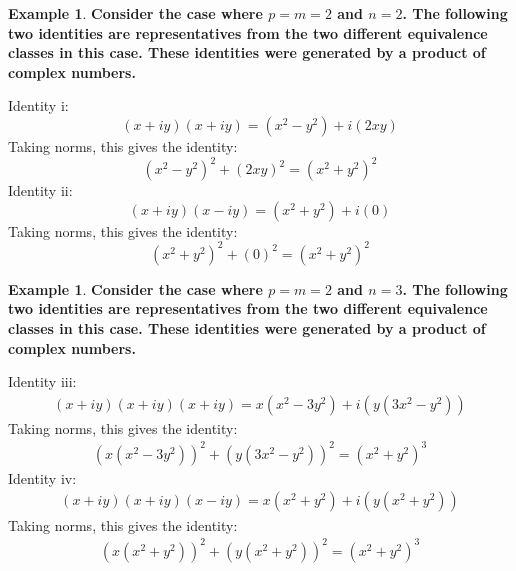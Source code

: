 \documentclass[12pt]{article}
\theoremstyle{definition}
\newtheorem{example}[theorem]{Example}
\numberwithin{equation}{section}
\begin{document}
\begin{example}
\bf
Consider the case where \( p = m = 2 \) and \( n = 2\).
The following two identities are representatives from 
the two different equivalence classes in this case. These identities
were generated by a product of complex numbers. 

\noindent
Identity i:
\begin{equation*}
(x + iy)(x + iy) = (x^2 - y^2 ) + i(2xy) 
\end{equation*}
Taking norms, this gives the identity:
\begin{equation*}
    (x^2 - y^2 )^2 + (2xy)^2 
    = (x^2 + y^2)^2
\end{equation*}
Identity ii:
\begin{equation*}
    (x + iy )(x - iy )
    = (x^2 + y^2 ) + i(0)  
\end{equation*}
Taking norms, this gives the identity:
\begin{equation*}
    (x^2 + y^2 )^2 + (0)^2
    = (x^2 + y^2 )^2
\end{equation*}
\end{example}



\begin{example}
\bf
Consider the case where \( p = m = 2 \) and \( n = 3\).
The following two identities are representatives from 
the two different equivalence classes in this case. These identities
were generated by a product of complex numbers. 

\noindent
Identity iii:
\begin{align*}
    (x + iy)(x + iy)(x + iy) 
    = x(x^2 - 3y^2) + i(  y(3x^2 - y^2) )  
    \end{align*}
Taking norms, this gives the identity:
    \begin{align*}
    (x(x^2 - 3y^2))^2 + (  y(3x^2 - y^2) )^2  
    = (x^2 + y^2)^3
    \end{align*}
Identity iv:
    \begin{align*}
    (x + iy )(x + iy)(x - iy ) 
    = x(x^2 + y^2 ) + i(y(x^2 + y^2))  
    \end{align*}
Taking norms, this gives the identity:
    \begin{align*}
    ( x(x^2 + y^2) )^2 + ( y(x^2 + y^2) )^2 
    = (x^2 + y^2 )^3
    \end{align*}
\end{example}
\end{document}
